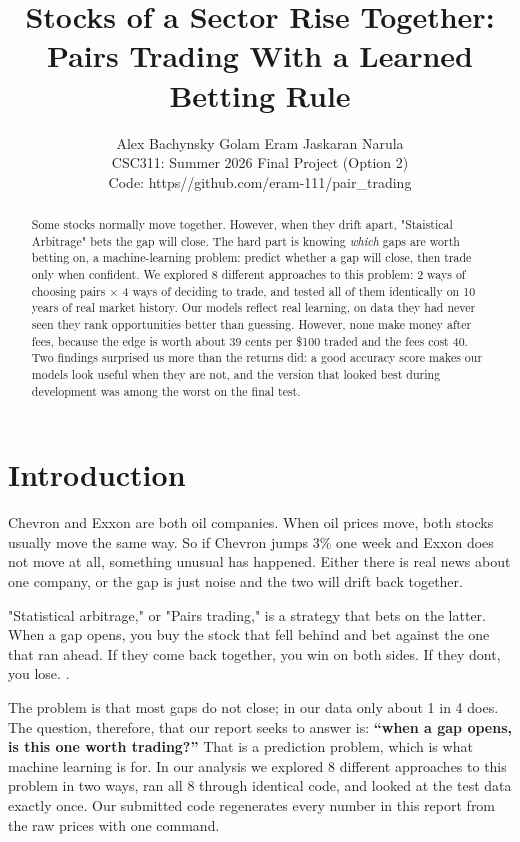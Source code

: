 \documentclass[10pt]{article}
\title{\vspace{-1.6em}\textbf{Stocks of a Sector Rise Together:\\
Pairs Trading With a Learned Betting Rule}}
\author{Alex Bachynsky \quad Golam Eram \quad Jaskaran Narula \\
\normalsize CSC311: Summer 2026 Final Project (Option 2)\\
\normalsize Code: https//github.com/eram-111/pair_trading}
\date{}
\begin{document}
\maketitle

\begin{abstract}
\noindent
Some stocks normally move together. However, when they drift apart, "Staistical Arbitrage" bets
the gap will close. The hard part is knowing \emph{which} gaps are worth betting
on, a machine-learning problem: predict whether a gap will close, then trade
only when confident. We explored 8 different approaches to this problem: 2 ways of choosing pairs $\times$ 4
ways of deciding to trade, and tested all of them identically on 10 years of
real market history. Our models reflect real learning, on data they had never seen they
rank opportunities better than guessing. However, none make money after fees, because
the edge is worth about 39 cents per \$100 traded and the fees cost 40. Two
findings surprised us more than the returns did: a good accuracy score makes our
models look useful when they are not, and the version that looked best during
development was among the worst on the final test.
\end{abstract}

\section{Introduction}

  Chevron and Exxon are both oil companies. When oil prices move, both stocks
usually move the same way. So if Chevron jumps 3\% one week and Exxon does not
move at all, something unusual has happened. Either there is real news about one
company, or the gap is just noise and the two will drift back together.

"Statistical arbitrage," or "Pairs trading," is a strategy that bets on the latter. When a gap
opens, you buy the stock that fell behind and bet against the one that ran ahead.
If they come back together, you win on both sides. If they dont, you lose.
\cite{gatev2006}.

The problem is that most gaps do not close; in our data only about 1
in 4 does. The question, therefore, that our report seeks to answer is: \textbf{``when a gap opens, is this one
worth trading?''} That is a prediction problem, which is what machine learning is
for. In our analysis we explored 8 different approaches to this problem in two ways, ran all 8 through identical
code, and looked at the test data exactly once. Our submitted code regenerates
every number in this report from the raw prices with one command.
\end{document}

